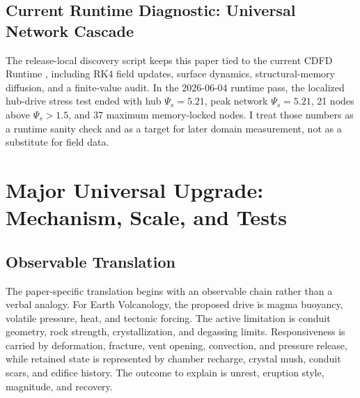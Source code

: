 \documentclass[11pt,a4paper]{article}
\begin{document}
\subsection{Current Runtime Diagnostic: Universal Network Cascade}
The release-local discovery script keeps this paper tied to the current CDFD Runtime \cite{CDFDRuntime2026}, including RK4 field updates, surface dynamics, structural-memory diffusion, and a finite-value audit. In the 2026-06-04 runtime pass, the localized hub-drive stress test ended with hub $\Psi_s=5.21$, peak network $\Psi_s=5.21$, 21 nodes above $\Psi_s>1.5$, and 37 maximum memory-locked nodes. I treat those numbers as a runtime sanity check and as a target for later domain measurement, not as a substitute for field data.


\section{Major Universal Upgrade: Mechanism, Scale, and Tests}

\subsection{Observable Translation}

The paper-specific translation begins with an observable chain rather than a
verbal analogy. For Earth Volcanology, the proposed drive is magma buoyancy, volatile pressure, heat, and tectonic forcing.
The active limitation is conduit geometry, rock strength, crystallization, and degassing limits. Responsiveness is carried by
deformation, fracture, vent opening, convection, and pressure release, while retained state is represented by
chamber recharge, crystal mush, conduit scars, and edifice history. The outcome to explain is unrest, eruption style, magnitude, and recovery.
\end{document}
